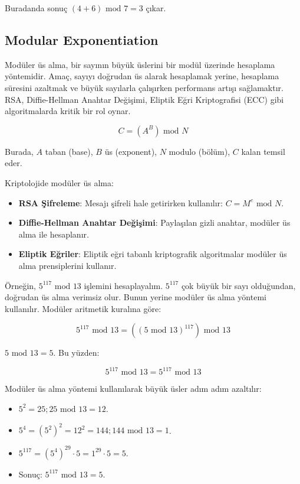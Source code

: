Buradanda sonuç $(4 + 6) \text{ mod } 7 = 3$ çıkar.

\newpage

\subsection{Modular Exponentiation}

Modüler üs alma, bir sayının büyük üslerini bir modül üzerinde hesaplama yöntemidir. Amaç, sayıyı doğrudan üs alarak hesaplamak yerine, hesaplama süresini azaltmak ve büyük sayılarla çalışırken performans artışı sağlamaktır. RSA, Diffie-Hellman Anahtar Değişimi, Eliptik Eğri Kriptografisi (ECC) gibi algoritmalarda kritik bir rol oynar.

\[ C = (A^B) \text{ mod } N \]

Burada, $A$ taban (base), $B$ üs (exponent), $N$ modulo (bölüm), $C$ kalan temsil eder.

Kriptolojide modüler üs alma:

\begin{itemize}
    \item \textbf{RSA Şifreleme}: Mesajı şifreli hale getirirken kullanılır: $C = M^e \text{ mod } N$.
    \item \textbf{Diffie-Hellman Anahtar Değişimi}: Paylaşılan gizli anahtar, modüler üs alma ile hesaplanır.
    \item \textbf{Eliptik Eğriler}: Eliptik eğri tabanlı kriptografik algoritmalar modüler üs alma prensiplerini kullanır.
\end{itemize}

Örneğin, $5^{117} \text{ mod } 13$ işlemini hesaplayalım. $5^{117}$ çok büyük bir sayı olduğundan, doğrudan üs alma verimsiz olur. Bunun yerine modüler üs alma yöntemi kullanılır. Modüler aritmetik kuralına göre:

\[ 5^{117} \text{ mod } 13 = ((5 \text{ mod } 13)^{117}) \text{ mod } 13 \]

$ 5 \text{ mod } 13 = 5$. Bu yüzden:

\[ 5^{117} \text{ mod } 13 = 5^{117} \text{ mod } 13 \]

Modüler üs alma yöntemi kullanılarak büyük üsler adım adım azaltılır:

\begin{itemize}
    \item $5^2 = 25; 25 \text{ mod } 13 = 12$.
    \item $5^4 = (5^{2})^2 = 12^2 = 144; 144 \text{ mod } 13 = 1$.
    \item $5^{117} = (5^4)^29 \cdot 5 = 1^{29} \cdot 5 = 5$.
    \item Sonuç: $5^{117} \text{ mod } 13 = 5$.
\end{itemize}

